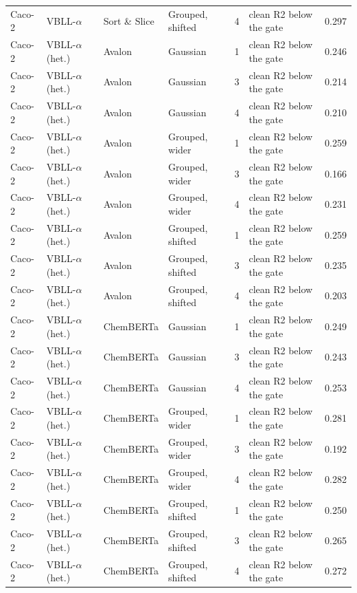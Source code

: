 {\begin{longtable}{llllcll}
Caco-2 & VBLL-$\alpha$ & Sort \& Slice & Grouped, shifted & 4 & clean R2 below the gate & 0.297 \\
Caco-2 & VBLL-$\alpha$ (het.) & Avalon & Gaussian & 1 & clean R2 below the gate & 0.246 \\
Caco-2 & VBLL-$\alpha$ (het.) & Avalon & Gaussian & 3 & clean R2 below the gate & 0.214 \\
Caco-2 & VBLL-$\alpha$ (het.) & Avalon & Gaussian & 4 & clean R2 below the gate & 0.210 \\
Caco-2 & VBLL-$\alpha$ (het.) & Avalon & Grouped, wider & 1 & clean R2 below the gate & 0.259 \\
Caco-2 & VBLL-$\alpha$ (het.) & Avalon & Grouped, wider & 3 & clean R2 below the gate & 0.166 \\
Caco-2 & VBLL-$\alpha$ (het.) & Avalon & Grouped, wider & 4 & clean R2 below the gate & 0.231 \\
Caco-2 & VBLL-$\alpha$ (het.) & Avalon & Grouped, shifted & 1 & clean R2 below the gate & 0.259 \\
Caco-2 & VBLL-$\alpha$ (het.) & Avalon & Grouped, shifted & 3 & clean R2 below the gate & 0.235 \\
Caco-2 & VBLL-$\alpha$ (het.) & Avalon & Grouped, shifted & 4 & clean R2 below the gate & 0.203 \\
Caco-2 & VBLL-$\alpha$ (het.) & ChemBERTa & Gaussian & 1 & clean R2 below the gate & 0.249 \\
Caco-2 & VBLL-$\alpha$ (het.) & ChemBERTa & Gaussian & 3 & clean R2 below the gate & 0.243 \\
Caco-2 & VBLL-$\alpha$ (het.) & ChemBERTa & Gaussian & 4 & clean R2 below the gate & 0.253 \\
Caco-2 & VBLL-$\alpha$ (het.) & ChemBERTa & Grouped, wider & 1 & clean R2 below the gate & 0.281 \\
Caco-2 & VBLL-$\alpha$ (het.) & ChemBERTa & Grouped, wider & 3 & clean R2 below the gate & 0.192 \\
Caco-2 & VBLL-$\alpha$ (het.) & ChemBERTa & Grouped, wider & 4 & clean R2 below the gate & 0.282 \\
Caco-2 & VBLL-$\alpha$ (het.) & ChemBERTa & Grouped, shifted & 1 & clean R2 below the gate & 0.250 \\
Caco-2 & VBLL-$\alpha$ (het.) & ChemBERTa & Grouped, shifted & 3 & clean R2 below the gate & 0.265 \\
Caco-2 & VBLL-$\alpha$ (het.) & ChemBERTa & Grouped, shifted & 4 & clean R2 below the gate & 0.272 \\

\end{longtable}}

